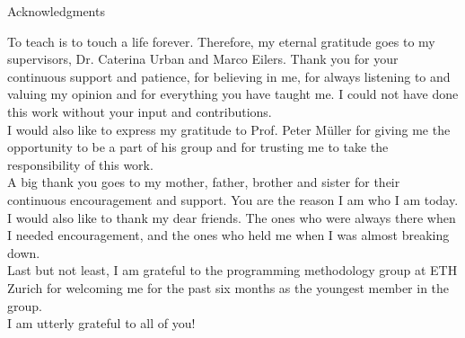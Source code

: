 \thispagestyle{empty}

\vspace*{20mm}

\begin{center}
{ Acknowledgments}
\end{center}

\vspace{10mm}

To teach is to touch a life forever. Therefore, my eternal gratitude goes to my supervisors, Dr. Caterina Urban and Marco Eilers. Thank you for your continuous support and patience, for believing in me, for always listening to and valuing my opinion and for everything you have taught me. I could not have done this work without your input and contributions. \\

I would also like to express my gratitude to Prof. Peter Müller for giving me the opportunity to be a part of his group and for trusting me to take the responsibility of this work. \\

A big thank you goes to my mother, father, brother and sister for their continuous encouragement and support. You are the reason I am who I am today. \\

I would also like to thank my dear friends. The ones who were always there when I needed encouragement, and the ones who held me when I was almost breaking down. \\

Last but not least, I am grateful to the programming methodology group at ETH Zurich for welcoming me for the past six months as the youngest member in the group. \\

I am utterly grateful to all of you!
\cleardoublepage{}
